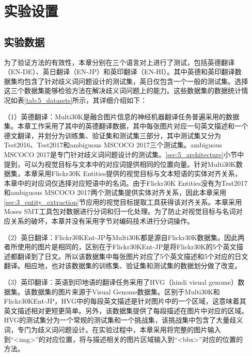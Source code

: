 \section{实验设置}
\label{sec:5_setup}

\subsection{实验数据}
\label{sec:5_datasets}

为了验证方法的有效性，本章分别在三个语言对上进行了测试，包括英德翻译（EN-DE）、英日翻译（EN-JP）和英印翻译（EN-HI）。其中英德和英印翻译数据集均包含了针对歧义词问题设计的测试集，英日仅包含一个一般的测试集。选择这三个数据集能够检验方法在解决歧义词问题上的能力。这些数据集的数据统计情况如表\ref{tab:5_datasets}所示，其详细介绍如下：

（1）{\sffamily 英德翻译：}Multi30K是融合图片信息的神经机器翻译任务普遍采用的数据集。本章工作采用了其中的英德翻译数据，其中每张图片对应一句英文描述和一个德文翻译，并划分为训练集、验证集和测试集三部分，其中测试集又分为Test2016、Test2017和ambiguous MSCOCO 2017三个测试集。ambiguous MSCOCO 2017是专门针对歧义词问题设计的测试集。\ref{sec:5_architecture}小节中提到，可以为视觉目标与文本中的对应词提供相同的位置向量。针对Multi30K数据集，本章采用Flickr30K Entities提供的视觉目标与文本短语的实体对齐关系，本章中的对应词仅选择对应短语中的名词。由于Flickr30K Entities没有为Test2017和ambiguous MSCOCO 2017两个测试集提供实体对齐关系，因此本章采用\ref{sec:3_entity_extraction}节应用的视觉目标提取工具获得该对齐关系。本章采用Moses SMT工具包对数据进行分词和归一化处理。为了防止对视觉目标与名词对应关系的破坏，本章并没有采用字节对编码技术进行分词操作。

（2）{\sffamily 英日翻译：}Flickr30KEnt-JP与Multi30K都是源自Flickr30K数据集。因此两者所使用的图片是相同的，区别在于Flickr30KEnt-JP是将Flickr30K的5个英文描述都翻译到了日文。所以该数据集中每张图片对应了5个英文描述和5个对应的日文翻译。相应地，也对该数据集的训练集、验证集和测试集的数据划分做了改变。

（3）{\sffamily 英印翻译：}英语到印地语的翻译任务采用了HVG（hindi visual genome）数据集。该数据集的图片来源于Visual Genome数据集。区别于Multi30K和Flickr30KEnt-JP，HVG中的每段英文描述是针对图片中的一个区域，这意味着其英文描述相对更短更简单。另外，该数据集提供了每段描述在图片中对应的区域。HVG的测试集分为一个常规的测试集和一个挑战集，该挑战集中包含了大量歧义词，专门为歧义词问题设计。在实验过程中，本章采用将完整的图片输入到“<img>”的对应位置，将与描述相关的图片区域输入到“<bbx>”对应的位置的方法。

